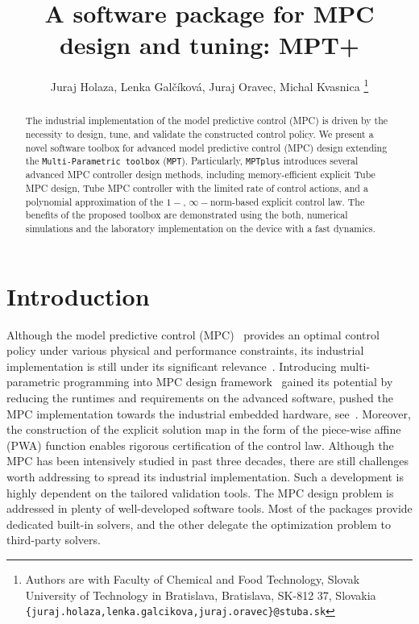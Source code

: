\documentclass[letterpaper, 10 pt, conference]{ieeeconf}
\title{\LARGE \bf
A software package for MPC design and tuning: MPT+
}
\author{Juraj Holaza, Lenka Gal\v{c}\'{i}kov\'{a}, Juraj Oravec, Michal Kvasnica
\thanks{Authors are with Faculty of Chemical and Food Technology,
		Slovak University of Technology in Bratislava, Bratislava, SK-812 37, Slovakia 
        \texttt{\{juraj.holaza,lenka.galcikova,juraj.oravec\}@stuba.sk}}
}
\begin{document}
\maketitle
\thispagestyle{empty}
\pagestyle{empty}

\begin{abstract}

The industrial implementation of the model predictive control (MPC) is driven by the necessity to design, tune, and validate the constructed control policy. 
We present a novel software toolbox for advanced model predictive control (MPC) design extending the \texttt{Multi-Parametric toolbox} (\texttt{MPT}).  Particularly, \texttt{MPTplus} introduces several advanced MPC controller design methods, including memory-efficient explicit Tube MPC design, Tube MPC controller with the limited rate of control actions, and a polynomial approximation of the $1-$, $\infty-$norm-based explicit control law. The benefits of the proposed toolbox are demonstrated using the both, numerical simulations and the laboratory implementation on the device with a fast dynamics.  

\end{abstract}

\section{Introduction}
\label{sec:introduction}

Although the model predictive control (MPC)~\cite{M00, B17} provides an optimal control policy under various physical and performance constraints, its industrial implementation is still under its significant relevance~\cite{QB03}. 
Introducing multi-parametric programming into MPC design framework~\cite{BM02} gained its potential by reducing the runtimes and requirements on the advanced software, pushed the MPC implementation towards the industrial embedded hardware, see~\cite{PK21}. Moreover, the construction of the explicit solution map in the form of the piece-wise affine (PWA) function enables rigorous certification of the control law. 
%
Although the MPC has been intensively studied in past three decades, there are still challenges worth addressing to spread its industrial implementation. Such a development is highly dependent on the tailored validation tools. 
The MPC design problem is addressed in plenty of well-developed software tools. Most of the packages provide dedicated built-in solvers, and the other delegate the optimization problem to third-party solvers. 
\end{document}
